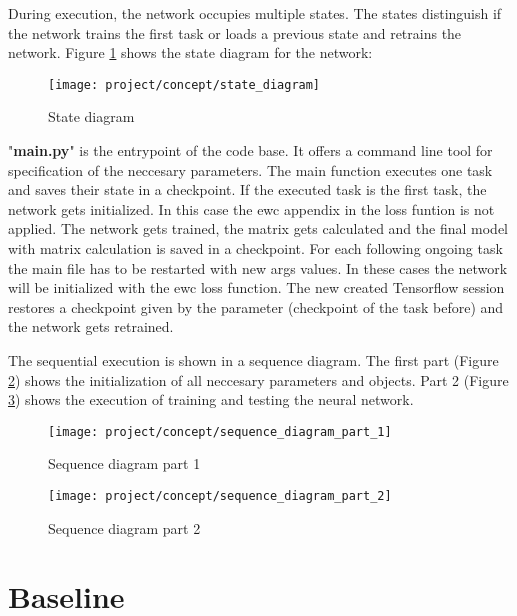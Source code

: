 During execution, the network occupies multiple states.
The states distinguish if the network trains the first task or loads a previous state and retrains the network.
Figure \ref{fig:concept_state_diagram} shows the state diagram for the network:

\begin{figure}[H]
    \centering
    \texttt{[image: project/concept/state\_diagram]}
    \caption{State diagram}
    \label{fig:concept_state_diagram}
\end{figure}

"\textbf{main.py}" is the entrypoint of the code base.
It offers a command line tool for specification of the neccesary parameters.
\newline
The main function executes one task and saves their state in a checkpoint.
If the executed task is the first task, the network gets initialized.
In this case the \acrshort{ewc} appendix in the loss funtion is not applied.
The network gets trained, the matrix gets calculated and the final model with matrix calculation is saved in a checkpoint.
For each following ongoing task the main file has to be restarted with new args values.
In these cases the network will be initialized with the \acrshort{ewc} loss function.
The new created Tensorflow session restores a checkpoint given by the parameter (checkpoint of the task before) and the network gets retrained.

The sequential execution is shown in a sequence diagram.
The first part (Figure \ref{fig:concept_sequence_diagram_part_1}) shows the initialization of all neccesary parameters and objects.
Part 2 (Figure \ref{fig:concept_sequence_diagram_part_2}) shows the execution of training and testing the neural network.

\begin{figure}[H]
    \centering
    \texttt{[image: project/concept/sequence\_diagram\_part\_1]}
    \caption{Sequence diagram part 1}
    \label{fig:concept_sequence_diagram_part_1}
\end{figure}

\begin{figure}[H]
    \centering
    \texttt{[image: project/concept/sequence\_diagram\_part\_2]}
    \caption{Sequence diagram part 2}
    \label{fig:concept_sequence_diagram_part_2}
\end{figure}

\newpage
\section{Baseline}
\label{project_baseline}


